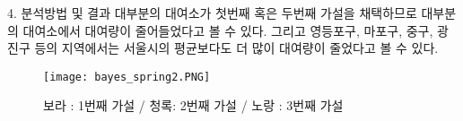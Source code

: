 \documentclass[mathserif]{beamer}
\begin{document}
\begin{frame}{4. 분석방법 및 결과}
\scriptsize 대부분의 대여소가 첫번째 혹은 두번째 가설을 채택하므로 대부분의 대여소에서 대여량이 줄어들었다고 볼 수 있다. 그리고 영등포구, 마포구, 중구, 광진구 등의 지역에서는 서울시의 평균보다도 더 많이 대여량이 줄었다고 볼 수 있다.
    \begin{figure}
        \centering
        \texttt{[image: bayes\_spring2.PNG]}
        \caption{\sqriptsize 보라 : 1번째 가설 / 청록: 2번째 가설 / 노랑 : 3번째 가설}
    \end{figure}
\end{frame}
\end{document}
